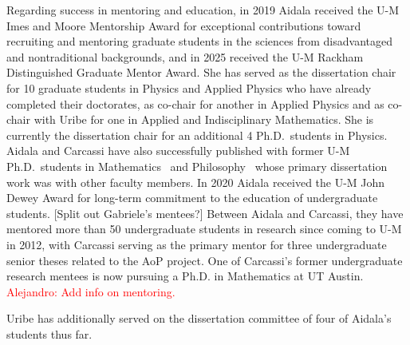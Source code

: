 Regarding success in mentoring and education, in 2019 Aidala received the U-M Imes and Moore Mentorship Award for exceptional contributions toward recruiting and mentoring graduate students in the sciences from disadvantaged and nontraditional backgrounds, and in 2025 received the U-M Rackham Distinguished Graduate Mentor Award.  She has served as the dissertation chair for 10 graduate students in Physics and Applied Physics who have already completed their doctorates, as co-chair for another in Applied Physics and as co-chair with Uribe for one in Applied and Indisciplinary Mathematics.  She is currently the dissertation chair for an additional 4 Ph.D.~students in Physics.  Aidala and Carcassi have also successfully published with former U-M Ph.D.~students in Mathematics~\cite{aop-topExpDisting} and Philosophy~\cite{aop-HamPriv,aop-unphysHilbert} whose primary dissertation work was with other faculty members.  In 2020 Aidala received the U-M John Dewey Award for long-term commitment to the education of undergraduate students.  [Split out Gabriele's mentees?] Between Aidala and Carcassi, they have mentored more than 50 undergraduate students in research since coming to U-M in 2012, with Carcassi serving as the primary mentor for three undergraduate senior theses related to the AoP project.  One of Carcassi's former undergraduate research mentees is now pursuing a Ph.D. in Mathematics at UT Austin.\\


\textcolor{red}{Alejandro: Add info on mentoring.}  

Uribe has additionally served on the dissertation committee of four of Aidala's students thus far.

